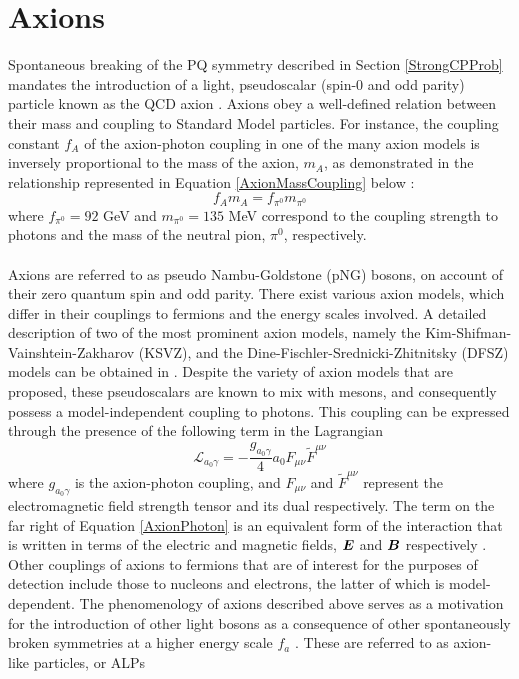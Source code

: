 \section{Axions}
Spontaneous breaking of the PQ symmetry described in Section \ref{StrongCPProb} mandates the introduction of a light, pseudoscalar (spin-0 and odd parity) particle known as the QCD axion \cite{article}. Axions obey a well-defined relation between their mass and coupling
to Standard Model particles. For instance, the coupling constant $f_{A}$ of the axion-photon coupling in one of the many axion models is inversely proportional to the mass of the axion, $m_{A}$, as demonstrated in the relationship represented in Equation \ref{AxionMassCoupling} below \cite{Michael:920}:
\begin{equation}\label{AxionMassCoupling}
    f_{A}m_{A} = f_{\pi^{0}}m_{\pi^{0}}
\end{equation}
where $f_{\pi^{0}} = 92$ GeV and $m_{\pi^{0}} = 135$ MeV correspond to the coupling strength to photons and the mass of the neutral pion, $\pi^{0}$, respectively.\\
\\
Axions are referred to as pseudo Nambu-Goldstone (pNG) bosons, on account of their zero quantum spin and odd parity. There exist various axion models, which differ in their couplings to fermions and the energy scales involved. A detailed description of two of the most prominent axion models, namely the Kim-Shifman-Vainshtein-Zakharov (KSVZ), and the Dine-Fischler-Srednicki-Zhitnitsky (DFSZ) models can be obtained in \cite{Garcia_Irastorza_2022}.
Despite the variety of axion models that are proposed, these pseudoscalars are known to mix with mesons, and consequently possess a model-independent coupling to photons. This coupling can be expressed through the presence of the following term in the Lagrangian \cite{Garcia_Irastorza_2022}
\begin{equation}\label{AxionPhoton}
    \mathcal{L}_{a_{0}\gamma} = -\frac{g_{a_{0}\gamma}}{4}a_{0}F_{\mu\nu}\tilde{F}^{\mu\nu}
\end{equation}
where $g_{a_{0}\gamma}$ is the axion-photon coupling, and $F_{\mu\nu}$ and $\tilde{F}^{\mu\nu}$ represent the electromagnetic field strength tensor and its dual respectively. The term on the far right of Equation \ref{AxionPhoton} is an equivalent form of the interaction that is written in terms of the electric and magnetic fields, $\vb*{E}$ and $\vb*{B}$ respectively \cite{Garcia_Irastorza_2022}. Other couplings of axions
to fermions that are of interest for the purposes of detection include those to nucleons and electrons, the latter of which is model-dependent. The phenomenology of axions described above serves as a motivation for the introduction of other light bosons as a consequence of other spontaneously broken symmetries at a higher energy scale $f_{a}$ \cite{Ringwald:2012hr}. These are referred to as axion-like particles, or ALPs
